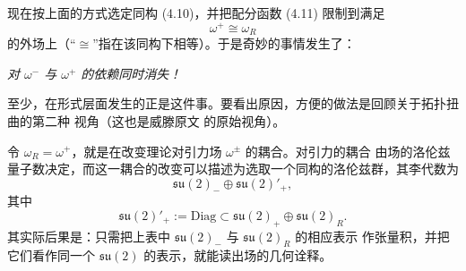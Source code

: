 
现在按上面的方式选定同构 (4.10)，并把配分函数 (4.11) 限制到满足
\begin{equation}
  \omega^{+}\cong\omega_{R}
  \tag{4.13}
\end{equation}
的外场上（“$\cong$”指在该同构下相等）。于是奇妙的事情发生了：

\begin{center}
\itshape 对 $\omega^{-}$ 与 $\omega^{+}$ 的依赖同时消失！
\end{center}


至少，在形式层面发生的正是这件事。要看出原因，方便的做法是回顾关于拓扑扭曲的第二种
视角（这也是威滕原文 \cite{ref53} 的原始视角）。

令 $\omega_{R}=\omega^{+}$，就是在改变理论对引力场 $\omega^{\pm}$ 的耦合。对引力的耦合
由场的洛伦兹量子数决定，而这一耦合的改变可以描述为选取一个同构的洛伦兹群，其李代数为
\begin{equation}
  \mathfrak{su}(2)_{-}\oplus\mathfrak{su}(2)'_{+},
  \tag{4.14}
\end{equation}
其中
\begin{equation}
  \mathfrak{su}(2)'_{+}:=\mathrm{Diag}\subset
  \mathfrak{su}(2)_{+}\oplus\mathfrak{su}(2)_{R}.
  \tag{4.15}
\end{equation}
其实际后果是：只需把上表中 $\mathfrak{su}(2)_{-}$ 与 $\mathfrak{su}(2)_{R}$ 的相应表示
作张量积，并把它们看作同一个 $\mathfrak{su}(2)$ 的表示，就能读出场的几何诠释。

